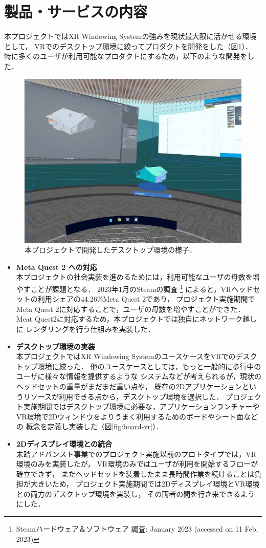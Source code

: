 \documentclass[12pt,a4paper]{jsarticle}
\begin{document}
\section{製品・サービスの内容}
本プロジェクトではXR Windowing Systemの強みを現状最大限に活かせる環境として，
VRでのデスクトップ環境に絞ってプロダクトを開発をした（図\ref{fig:zen}）．
特に多くのユーザが利用可能なプロダクトにするため，以下のような開発をした．

\begin{figure}[htbp]
  \centering
  \includegraphics[keepaspectratio, width=0.6\linewidth]{fig/zen.png}
  \caption{本プロジェクトで開発したデスクトップ環境の様子．}
  \label{fig:zen}
\end{figure}

\begin{itemize}
  \item \textbf{Meta Quest 2 への対応} \\
        本プロジェクトの社会実装を進めるためには，利用可能なユーザの母数を増やすことが課題となる．
        2023年1月のSteamの調査
        \footnote{Steamハードウェア＆ソフトウェア 調査: January 2023 (accessed on 11 Feb, 2023)}
        によると，VRヘッドセットの利用シェアの44.26\%Meta Quest 2であり，
        プロジェクト実施期間でMeta Quest 2に対応することで，ユーザの母数を増やすことができた．
        Meat Quest2に対応するため，本プロジェクトでは独自にネットワーク越しに
        レンダリングを行う仕組みを実装した．
  \item \textbf{デスクトップ環境の実装} \\
        本プロジェクトではXR Windowing SystemのユースケースをVRでのデスクトップ環境に絞った．
        他のユースケースとしては，もっと一般的に歩行中のユーザに様々な情報を提供するような
        システムなどが考えられるが，現状のヘッドセットの重量がまだまだ重い点や，
        既存の2Dアプリケーションというリソースが利用できる点から，デスクトップ環境を選択した．
        プロジェクト実施期間ではデスクトップ環境に必要な，アプリケーションランチャーや
        VR環境で2Dウィンドウをよりうまく利用するためのボードやシート面などの
        概念を定義し実装した（図\ref{fig:board-vr}）．
  \item \textbf{2Dディスプレイ環境との統合} \\
        未踏アドバンスト事業でのプロジェクト実施以前のプロトタイプでは，VR環境のみを実装したが，
        VR環境のみではユーザが利用を開始するフローが確立できず，
        またヘッドセットを装着したまま長時間作業を続けることは負担が大きいため，
        プロジェクト実施期間では2Dディスプレイ環境とVR環境との両方のデスクトップ環境を実装し，
        その両者の間を行き来できるようにした．
\end{itemize}
\end{document}
